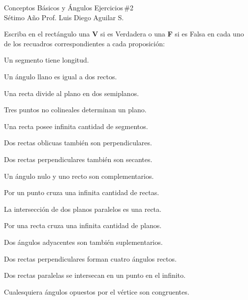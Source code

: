 \documentclass[fleqn]{article}
\begin{document}
 \ec \vspace{-5mm}
 \ec \vspace{-5mm}
\hrulefill \vspace{2mm}

\normalsize\sf
{\sf Conceptos Básicos y Ángulos \hfill Ejercicios\,\#2 \\
Sétimo Año \hfill Prof. Luis Diego Aguilar S.}

\hrulefill \vspace{2mm}

Escriba en el rectángulo una {\bf V} si es {\sc Verdadera} o una {\bf F} si es {\sc Falsa} en cada uno de los recuadros correspondientes a cada proposición:

\benu

\item Un segmento tiene longitud. \hfill \fv
\item Un ángulo llano es igual a dos rectos. \hfill \fv
\item Una recta divide al plano en dos semiplanos. \hfill \fv
\item Tres puntos no colineales determinan un plano. \hfill \fv
\item Una recta posee infinita cantidad de segmentos. \hfill \fv
\item Dos rectas oblicuas también son perpendiculares. \hfill \fv
\item Dos rectas perpendiculares también son secantes. \hfill \fv
\item Un ángulo nulo y uno recto son complementarios. \hfill \fv
\item Por un punto cruza una infinita cantidad de rectas. \hfill \fv
\item La intersección de dos planos paralelos es una recta. \hfill \fv
\item Por una recta cruza una infinita cantidad de planos. \hfill \fv
\item Dos ángulos adyacentes son también suplementarios. \hfill \fv
\item Dos rectas perpendiculares forman cuatro ángulos rectos. \hfill \fv
\item Dos rectas paralelas se intersecan en un punto en el infinito. \hfill \fv
\item Cualesquiera ángulos opuestos por el vértice son congruentes. \hfill \fv
\end{document}
